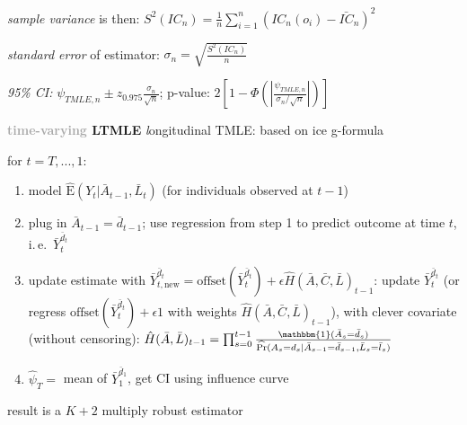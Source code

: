 \documentclass[8pt,twoside]{extarticle}
\begin{document}
\begin{multicols}{2}
\noindent \textit{sample variance} is then: $S^2(IC_n) = \frac{1}{n}\sum_{i=1}^n\left(IC_n(o_i) - \bar{IC}_n\right)^2$

\noindent \textit{standard error} of estimator: $\sigma_n = \sqrt{\frac{S^2(IC_n)}{n}}$

\noindent \textit{95\% CI:} $\psi_{TMLE,n} \pm z_{0.975}\frac{\sigma_n}{\sqrt{n}}$; p-value: $2\left[1-\Phi\left(\left|\frac{\psi_{TMLE,n}}{\sigma_n/\sqrt{n}}\right|\right)\right]$

\vspace{0.2em}
\noindent \colorbox{lightgray!20!white}{\begin{minipage}{28em}

\textbf{\textcolor{darkgray}{time-varying} LTMLE}
 \citep{schomaker_using_2019, van2012targeted} \textit{l}ongitudinal TMLE: based on ice g-formula

\noindent for $t=T,..., 1$:
\begin{enumerate}[leftmargin=*, itemsep=0em, topsep=0pt, partopsep=0pt,parsep=0pt]
\item model $\widehat{\mathrm{E}}(Y_t|\bar{A}_{t-1}, \bar{L}_t)$ (for individuals observed at $t{-}1$)

\item plug in $\bar{A}_{t-1}=\bar{d}_{t-1}$; use regression from step 1 to predict outcome at time $t$, i.\,e.\ $\bar{Y}_t^{\bar{d}_t}$ 

\item update estimate
with $\bar{Y}_{t,\text{new}}^{\bar{d}_t} = \mathrm{offset}(\bar{Y}_t^{\bar{d}_t}) + \epsilon \hat{H}(\bar{A},\bar{C},\bar{L})_{t-1}$: update $\bar{Y}_t^{\bar{d}_t}$ (or regress $\mathrm{offset}(\bar{Y}_t^{\bar{d}_t}) + \epsilon 1$ with weights $\hat{H}(\bar{A},\bar{C},\bar{L})_{t-1}$), with
clever covariate (without censoring): $\hat{H}(\bar{A},\bar{L})_{t-1}=\prod_{s=0}^{t-1}\frac{\mathbbm{1}(\bar{A}_s = \bar{d}_s)}{\widehat{\mathrm{Pr}}(A_s=d_s| \bar{A}_{s-1} = \bar{d}_{s{-}1}, \bar{L}_s = \bar{l}_s )}$

\item $\hat{\psi}_T =$ mean of $\bar{Y}_1^{\bar{d}_1}$, get CI using influence curve
\end{enumerate}

result is a $K+2$ multiply robust estimator \citep{diaz2021nonparametric}

\end{minipage}}




\vspace{0.5em}


\end{multicols}
\end{document}
